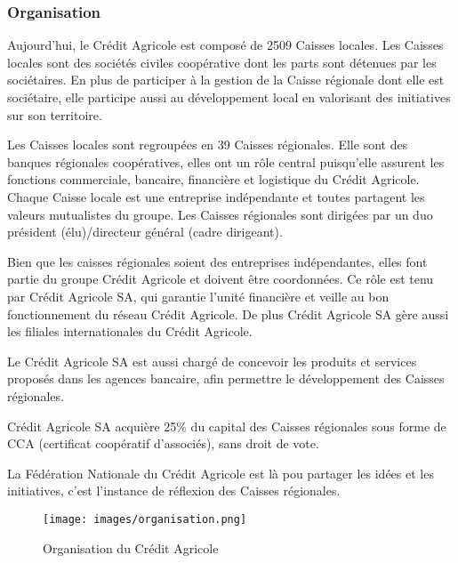 \documentclass[12pt,a4paper]{article}
\begin{document}
\subsubsection{Organisation}
Aujourd'hui, le Crédit Agricole est composé de 2509 Caisses locales. Les Caisses locales sont des sociétés civiles coopérative dont les parts sont détenues par les sociétaires. En plus de participer à la gestion de la Caisse régionale dont elle est sociétaire, elle participe aussi au développement local en valorisant des initiatives sur son territoire.\par 
\medskip
Les Caisses locales sont regroupées en 39 Caisses régionales. Elle sont des banques régionales coopératives, elles ont un rôle central puisqu'elle assurent les fonctions commerciale, bancaire, financière et logistique du Crédit Agricole. Chaque Caisse locale est une entreprise indépendante et toutes partagent les valeurs mutualistes du groupe. Les Caisses régionales sont dirigées par un duo président (élu)/directeur général (cadre dirigeant). \par 
\medskip
Bien que les caisses régionales soient des entreprises indépendantes, elles font partie du groupe Crédit Agricole et doivent être coordonnées. Ce rôle est tenu par Crédit Agricole SA, qui garantie l'unité financière et veille au bon fonctionnement du réseau Crédit Agricole. De plus Crédit Agricole SA gère aussi les filiales internationales du Crédit Agricole.\par 
Le Crédit Agricole SA est aussi chargé de concevoir les produits et services proposés dans les agences bancaire, afin permettre le développement des Caisses régionales.\par
Crédit Agricole SA acquière 25\% du capital des Caisses régionales sous forme de CCA (certificat coopératif d'associés), sans droit de vote.\par 
\medskip
La Fédération Nationale du Crédit Agricole est là pou partager les idées et les initiatives, c'est l'instance de réflexion des Caisses régionales.

\begin{figure}[h!]
\centering
\texttt{[image: images/organisation.png]}
\caption{Organisation du Crédit Agricole}
\end{figure}

\newpage
\end{document}
